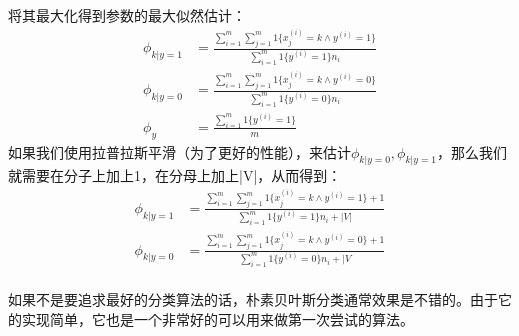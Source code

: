 \documentclass[UTF8]{ctexart}
\begin{document}
将其最大化得到参数的最大似然估计：
\begin{align*}
 \phi_{k|y=1} & = \frac{\sum_{i=1}^{m} \sum_{j=1}^{m}  1 \{  x_{j}^{(i)} = k \land y^{(i)}=1 \} }{ \sum_{i=1}^{m} 1 \{y^{(i)}=1  \}n_{i}  } \\
 \phi_{k|y=0} & = \frac{\sum_{i=1}^{m} \sum_{j=1}^{m}  1 \{  x_{j}^{(i)} = k \land y^{(i)}=0 \} }{ \sum_{i=1}^{m} 1 \{y^{(i)}=0  \}n_{i}  } \\
\phi_{y} & =  \frac{\sum_{i=1}^{m}1 \{y^{(i)}=1  \} }{m} 
\end{align*}
如果我们使用拉普拉斯平滑（为了更好的性能），来估计$\phi_{k|y=0},\phi_{k|y=1}$，那么我们就需要在分子上加上1，在分母上加上|V|，从而得到：
\begin{align*}
 \phi_{k|y=1} & = \frac{\sum_{i=1}^{m} \sum_{j=1}^{m}  1 \{  x_{j}^{(i)} = k \land y^{(i)}=1 \} +1}{ \sum_{i=1}^{m} 1 \{y^{(i)}=1  \}n_{i} +|V| } \\
 \phi_{k|y=0} & = \frac{\sum_{i=1}^{m} \sum_{j=1}^{m}  1 \{  x_{j}^{(i)} = k \land y^{(i)}=0 \} +1}{ \sum_{i=1}^{m} 1 \{y^{(i)}=0  \}n_{i}  +|V} \\
\end{align*}

如果不是要追求最好的分类算法的话，朴素贝叶斯分类通常效果是不错的。由于它的实现简单，它也是一个非常好的可以用来做第一次尝试的算法。
\end{document}
